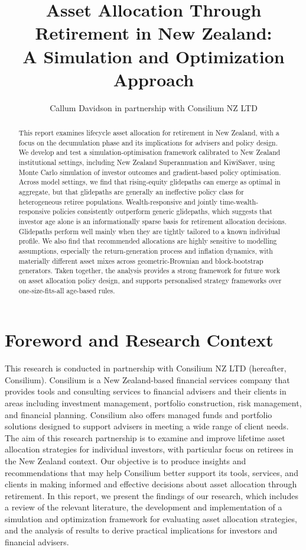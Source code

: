 \documentclass[11pt]{article}
\title{Asset Allocation Through Retirement in New Zealand: \\A Simulation and Optimization Approach}
\author{Callum Davidson in partnership with Consilium NZ LTD}
\begin{document}
\maketitle

\begin{abstract}
This report examines lifecycle asset allocation for retirement in New Zealand, with a focus on the decumulation phase and its implications for advisers and policy design. We develop and test a simulation-optimisation framework calibrated to New Zealand institutional settings, including New Zealand Superannuation and KiwiSaver, using Monte Carlo simulation of investor outcomes and gradient-based policy optimisation. Across model settings, we find that rising-equity glidepaths can emerge as optimal in aggregate, but that glidepaths are generally an ineffective policy class for heterogeneous retiree populations. Wealth-responsive and jointly time-wealth-responsive policies consistently outperform generic glidepaths, which suggests that investor age alone is an informationally sparse basis for retirement allocation decisions. Glidepaths perform well mainly when they are tightly tailored to a known individual profile. We also find that recommended allocations are highly sensitive to modelling assumptions, especially the return-generation process and inflation dynamics, with materially different asset mixes across geometric-Brownian and block-bootstrap generators. Taken together, the analysis provides a strong framework for future work on asset allocation policy design, and supports personalised strategy frameworks over one-size-fits-all age-based rules.
\end{abstract}

\section{Foreword and Research Context}

This research is conducted in partnership with Consilium NZ LTD (hereafter, Consilium). Consilium is a New Zealand-based financial services company that provides tools and consulting services to financial advisers and their clients in areas including investment management, portfolio construction, risk management, and financial planning. Consilium also offers managed funds and portfolio solutions designed to support advisers in meeting a wide range of client needs. The aim of this research partnership is to examine and improve lifetime asset allocation strategies for individual investors, with particular focus on retirees in the New Zealand context. Our objective is to produce insights and recommendations that may help Consilium better support its tools, services, and clients in making informed and effective decisions about asset allocation through retirement. In this report, we present the findings of our research, which includes a review of the relevant literature, the development and implementation of a simulation and optimization framework for evaluating asset allocation strategies, and the analysis of results to derive practical implications for investors and financial advisers.
\end{document}
